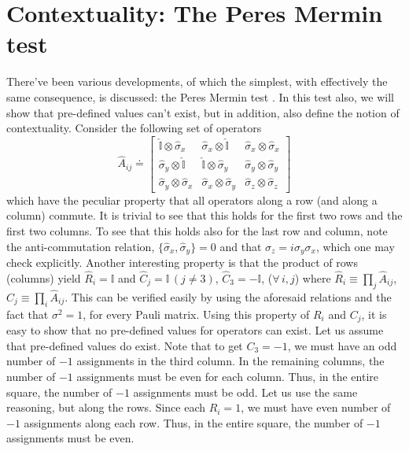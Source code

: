 \section{Contextuality: The Peres Mermin test\label{sec:Contextuality:-The-Peres}}

There've been various developments, of which the simplest, with effectively
the same consequence, is discussed: the Peres Mermin test \cite{Peres,Mermin}.
In this test also, we will show that pre-defined values can't exist,
but in addition, also define the notion of contextuality. Consider
the following set of operators 
\[
\hat{A}_{ij}\doteq\left[\begin{array}{ccc}
\hat{\mathbb{I}}\otimes\hat{\sigma}_{x} & \hat{\sigma}_{x}\otimes\hat{\mathbb{I}} & \hat{\sigma}_{x}\otimes\hat{\sigma}_{x}\\
\hat{\sigma}_{y}\otimes\hat{\mathbb{I}} & \hat{\mathbb{I}}\otimes\hat{\sigma}_{y} & \hat{\sigma}_{y}\otimes\hat{\sigma}_{y}\\
\hat{\sigma}_{y}\otimes\hat{\sigma}_{x} & \hat{\sigma}_{x}\otimes\hat{\sigma}_{y} & \hat{\sigma}_{z}\otimes\hat{\sigma}_{z}
\end{array}\right]
\]
which have the peculiar property that all operators along a row (and
along a column) commute. It is trivial to see that this holds for
the first two rows and the first two columns. To see that this holds
also for the last row and column, note the anti-commutation relation,
$\{\hat{\sigma}_{x},\hat{\sigma}_{y}\}=0$ and that $\sigma_{z}=i\sigma_{y}\sigma_{x}$,
which one may check explicitly. Another interesting property is that
the product of rows (columns) yield $\hat{R}_{i}=\mathbb{I}$ and
$\hat{C}_{j}=\mathbb{I}\,(j\neq3)$, $\hat{C}_{3}=-\mathbb{I}$, ($\forall\,i,j$)
where $\hat{R}_{i}\equiv\prod_{j}\hat{A}_{ij}$, $\hat{C}_{j}\equiv\prod_{i}\hat{A}_{ij}$.
This can be verified easily by using the aforesaid relations and the
fact that $\sigma^{2}=1$, for every Pauli matrix. Using this property
of $R_{i}$ and $C_{j}$, it is easy to show that no pre-defined values
for operators can exist. Let us assume that pre-defined values do
exist. Note that to get $C_{3}=-1$, we must have an odd number of
$-1$ assignments in the third column. In the remaining columns, the
number of $-1$ assignments must be even for each column. Thus, in
the entire square, the number of $-1$ assignments must be odd. Let
us use the same reasoning, but along the rows. Since each $R_{i}=1$,
we must have even number of $-1$ assignments along each row. Thus,
in the entire square, the number of $-1$ assignments must be even.
